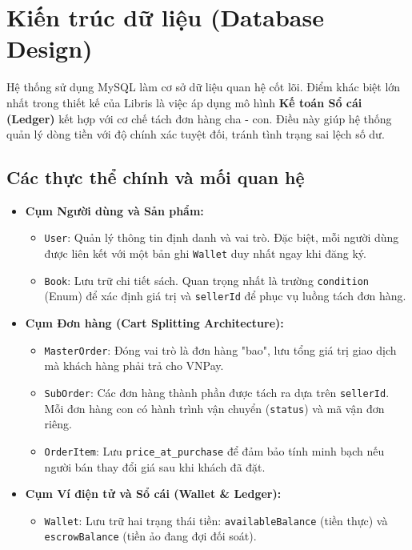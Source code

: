 \documentclass[../main.tex]{subfiles}
\begin{document}
\section{Kiến trúc dữ liệu (Database Design)}
Hệ thống sử dụng MySQL làm cơ sở dữ liệu quan hệ cốt lõi. Điểm khác biệt lớn nhất trong thiết kế của Libris là việc áp dụng mô hình \textbf{Kế toán Sổ cái (Ledger)} kết hợp với cơ chế tách đơn hàng cha - con. Điều này giúp hệ thống quản lý dòng tiền với độ chính xác tuyệt đối, tránh tình trạng sai lệch số dư.

\subsection{Các thực thể chính và mối quan hệ}
\begin{itemize}
    \item \textbf{Cụm Người dùng và Sản phẩm:}
        \begin{itemize}
            \item \texttt{User}: Quản lý thông tin định danh và vai trò. Đặc biệt, mỗi người dùng được liên kết với một bản ghi \texttt{Wallet} duy nhất ngay khi đăng ký.
            \item \texttt{Book}: Lưu trữ chi tiết sách. Quan trọng nhất là trường \texttt{condition} (Enum) để xác định giá trị và \texttt{sellerId} để phục vụ luồng tách đơn hàng.
        \end{itemize}
    \item \textbf{Cụm Đơn hàng (Cart Splitting Architecture):}
        \begin{itemize}
            \item \texttt{MasterOrder}: Đóng vai trò là đơn hàng "bao", lưu tổng giá trị giao dịch mà khách hàng phải trả cho VNPay.
            \item \texttt{SubOrder}: Các đơn hàng thành phần được tách ra dựa trên \texttt{sellerId}. Mỗi đơn hàng con có hành trình vận chuyển (\texttt{status}) và mã vận đơn riêng.
            \item \texttt{OrderItem}: Lưu \texttt{price\_at\_purchase} để đảm bảo tính minh bạch nếu người bán thay đổi giá sau khi khách đã đặt.
        \end{itemize}
    \item \textbf{Cụm Ví điện tử và Sổ cái (Wallet \& Ledger):}
        \begin{itemize}
            \item \texttt{Wallet}: Lưu trữ hai trạng thái tiền: \texttt{availableBalance} (tiền thực) và \texttt{escrowBalance} (tiền ảo đang đợi đối soát).

\end{itemize}
\end{itemize}
\end{document}
